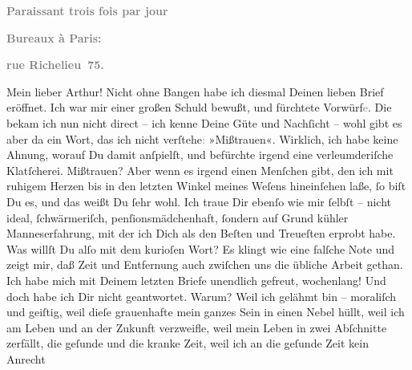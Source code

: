 \begin{ledgroupsized}[t]{13cm}
           \pstart
           \begin{otherlanguage}{french}\textcolor{gray}{\textbf{\textbf{Paraissant trois fois par jour}}}\end{otherlanguage}\pend
           \pstart
           \begin{otherlanguage}{french}\textcolor{gray}{\textbf{\textbf{Bureaux à Paris:}}}\end{otherlanguage}\pend
           \pstart
           \begin{otherlanguage}{french}\textcolor{gray}{\textbf{\textbf{rue Richelieu 75.}}}\end{otherlanguage}\pend
           \pstart\center{}Mein lieber Arthur!\pend\pstart
           Nicht ohne Bangen habe ich diesmal Deinen lieben Brief eröffnet. Ich war mir einer
               großen Schuld bewußt, und fürchtete Vorwürf\textcolor{gray}{e}. Die bekam ich nun
               nicht direct – ich kenne Deine Güte und Nachſicht – wohl gibt es aber da ein Wort,
               das ich nicht verſtehe\textcolor{gray}{:} »Mißtrauen«. Wirklich, ich habe keine
               Ahnung, worauf Du damit anſpielſt, und befürchte irgend eine verleumderiſche
               Klatſcherei. Mißtrauen? Aber wenn es irgend einen Menſchen gibt, den ich mit ruhigem
               Herzen bis in den letzten Winkel meines Weſens hineinſehen laße, ſo {\pb}biſt Du es, und das weißt Du ſehr wohl. Ich traue
               Dir ebenſo wie mir ſelbſt – nicht ideal, ſchwärmeriſch, penſionsmädchenhaft, ſondern
               auf Grund kühler Manneserfahrung, mit der ich Dich als den Beſten und Treueſten
               erprobt habe. Was willſt Du alſo mit dem kurioſen Wort? Es klingt wie eine falſche
               Note und zeigt mir, daß Zeit und Entfernung auch zwiſchen uns die übliche Arbeit
               gethan.\pend
           \pstart
           Ich habe mich mit Deinem letzten Briefe unendlich gefreut, wochenlang! Und doch habe
               ich Dir nicht geantwortet. Warum? Weil ich gelähmt bin – moraliſch und geiſtig, weil
                  dieſe grauenhafte \label{K_L02711-1v}\label{K_L02711-1h} mein ganzes Sein in einen Nebel hüllt, weil ich am Leben und an der Zukunft
               verzweifle, weil mein Leben {\pb}in zwei Abſchnitte
               zerfällt, die geſunde und die kranke Zeit, weil ich an die geſunde Zeit kein Anrecht

\end{ledgroupsized}
